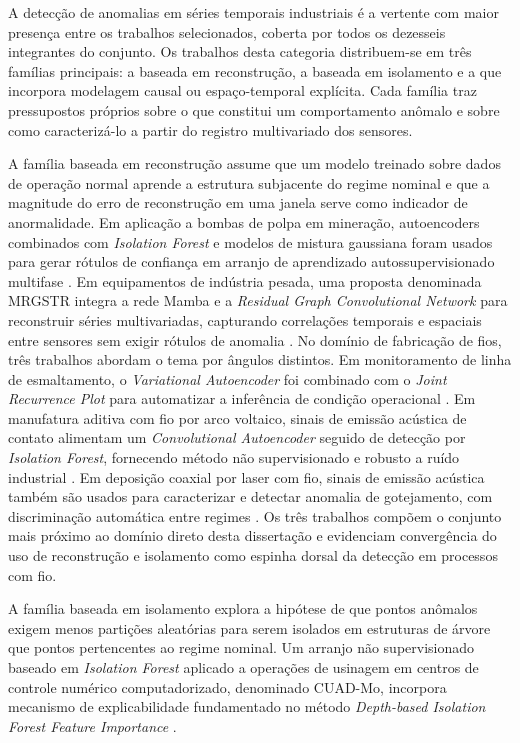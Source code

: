 A detecção de anomalias em séries temporais industriais é a vertente com maior presença entre os trabalhos selecionados, coberta por todos os dezesseis integrantes do conjunto. Os trabalhos desta categoria distribuem-se em três famílias principais: a baseada em reconstrução, a baseada em isolamento e a que incorpora modelagem causal ou espaço-temporal explícita. Cada família traz pressupostos próprios sobre o que constitui um comportamento anômalo e sobre como caracterizá-lo a partir do registro multivariado dos sensores.

A família baseada em reconstrução assume que um modelo treinado sobre dados de operação normal aprende a estrutura subjacente do regime nominal e que a magnitude do erro de reconstrução em uma janela serve como indicador de anormalidade. Em aplicação a bombas de polpa em mineração, autoencoders combinados com \emph{Isolation Forest} e modelos de mistura gaussiana foram usados para gerar rótulos de confiança em arranjo de aprendizado autossupervisionado multifase \cite{islam2026explainable}. Em equipamentos de indústria pesada, uma proposta denominada MRGSTR integra a rede Mamba e a \emph{Residual Graph Convolutional Network} para reconstruir séries multivariadas, capturando correlações temporais e espaciais entre sensores sem exigir rótulos de anomalia \cite{wang2025spatiotemporal}. No domínio de fabricação de fios, três trabalhos abordam o tema por ângulos distintos. Em monitoramento de linha de esmaltamento, o \emph{Variational Autoencoder} foi combinado com o \emph{Joint Recurrence Plot} para automatizar a inferência de condição operacional \cite{gatmaitan2021variational}. Em manufatura aditiva com fio por arco voltaico, sinais de emissão acústica de contato alimentam um \emph{Convolutional Autoencoder} seguido de detecção por \emph{Isolation Forest}, fornecendo método não supervisionado e robusto a ruído industrial \cite{mattera2026waam}. Em deposição coaxial por laser com fio, sinais de emissão acústica também são usados para caracterizar e detectar anomalia de gotejamento, com discriminação automática entre regimes \cite{xie2026coaxial}. Os três trabalhos compõem o conjunto mais próximo ao domínio direto desta dissertação e evidenciam convergência do uso de reconstrução e isolamento como espinha dorsal da detecção em processos com fio.

A família baseada em isolamento explora a hipótese de que pontos anômalos exigem menos partições aleatórias para serem isolados em estruturas de árvore que pontos pertencentes ao regime nominal. Um arranjo não supervisionado baseado em \emph{Isolation Forest} aplicado a operações de usinagem em centros de controle numérico computadorizado, denominado CUAD-Mo, incorpora mecanismo de explicabilidade fundamentado no método \emph{Depth-based Isolation Forest Feature Importance} \cite{lorenti2022cuadmo}.

